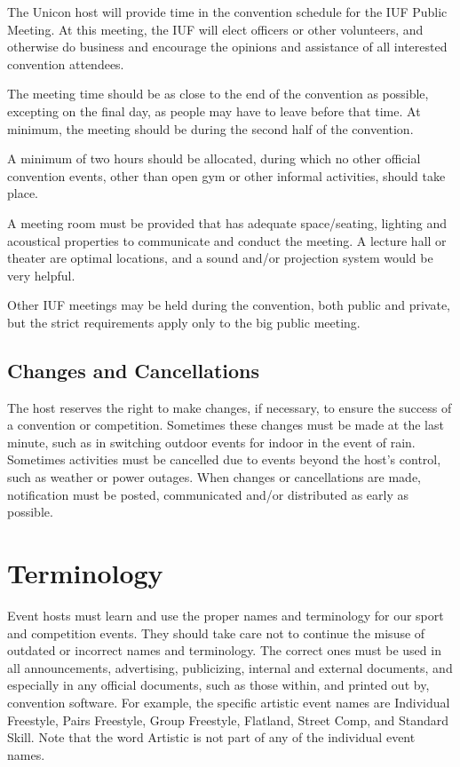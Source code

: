 The Unicon host will provide time in the convention schedule for the IUF Public Meeting.
At this meeting, the IUF will elect officers or other volunteers, and otherwise do business and encourage the opinions and assistance of all interested convention attendees.

The meeting time should be as close to the end of the convention as possible, excepting on the final day, as people may have to leave before that time.
At minimum, the meeting should be during the second half of the convention.

A minimum of two hours should be allocated, during which no other official convention events, other than open gym or other informal activities, should take place.

A meeting room must be provided that has adequate space/seating, lighting and acoustical properties to communicate and conduct the meeting.
A lecture hall or theater are optimal locations, and a sound and/or projection system would be very helpful.

Other IUF meetings may be held during the convention, both public and private, but the strict requirements apply only to the big public meeting.

\section{Changes and Cancellations}

The host reserves the right to make changes, if necessary, to ensure the success of a convention or competition.
Sometimes these changes must be made at the last minute, such as in switching outdoor events for indoor in the event of rain.
Sometimes activities must be cancelled due to events beyond the host's control, such as weather or power outages.
When changes or cancellations are made, notification must be posted, communicated and/or distributed as early as possible.

\chapter{Terminology}

Event hosts must learn and use the proper names and terminology for our sport and competition events.
They should take care not to continue the misuse of outdated or incorrect names and terminology.
The correct ones must be used in all announcements, advertising, publicizing, internal and external documents, and especially in any official documents, such as those within, and printed out by, convention software.
For example, the specific artistic event names are Individual Freestyle, Pairs Freestyle, Group Freestyle, Flatland, Street Comp, and Standard Skill.
Note that the word Artistic is not part of any of the individual event names.

